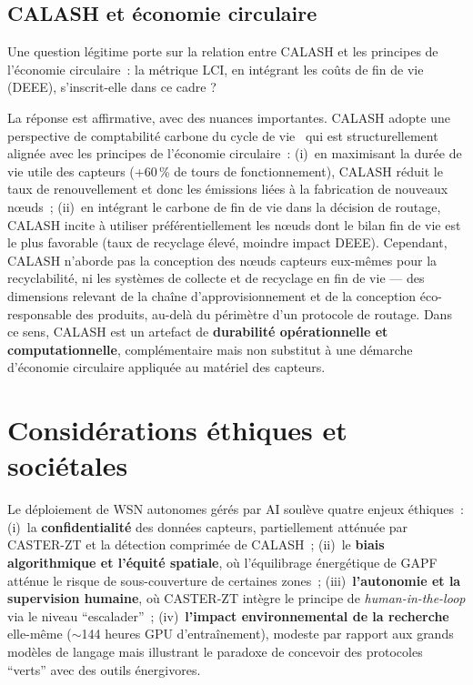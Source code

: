 \subsection{CALASH et économie circulaire}\label{sec:disc-circular}

Une question légitime porte sur la relation entre CALASH et les principes de l'économie circulaire~: la métrique LCI, en intégrant les coûts de fin de vie (DEEE), s'inscrit-elle dans ce cadre ?

La réponse est affirmative, avec des nuances importantes. CALASH adopte une perspective de comptabilité carbone du cycle de vie~\cite{iso14040} qui est structurellement alignée avec les principes de l'économie circulaire~: (i)~en maximisant la durée de vie utile des capteurs (+60\,\% de tours de fonctionnement), CALASH réduit le taux de renouvellement et donc les émissions liées à la fabrication de nouveaux nœuds~; (ii)~en intégrant le carbone de fin de vie dans la décision de routage, CALASH incite à utiliser préférentiellement les nœuds dont le bilan fin de vie est le plus favorable (taux de recyclage élevé, moindre impact DEEE). Cependant, CALASH n'aborde pas la conception des nœuds capteurs eux-mêmes pour la recyclabilité, ni les systèmes de collecte et de recyclage en fin de vie --- des dimensions relevant de la chaîne d'approvisionnement et de la conception éco-responsable des produits, au-delà du périmètre d'un protocole de routage. Dans ce sens, CALASH est un artefact de \textbf{durabilité opérationnelle et computationnelle}, complémentaire mais non substitut à une démarche d'économie circulaire appliquée au matériel des capteurs.


\section{Considérations éthiques et sociétales}\label{sec:disc-ethique}

Le déploiement de WSN autonomes gérés par AI soulève quatre enjeux éthiques~: (i)~la \textbf{confidentialité} des données capteurs, partiellement atténuée par CASTER-ZT et la détection comprimée de CALASH~; (ii)~le \textbf{biais algorithmique et l'équité spatiale}, où l'équilibrage énergétique de GAPF atténue le risque de sous-couverture de certaines zones~; (iii)~\textbf{l'autonomie et la supervision humaine}, où CASTER-ZT intègre le principe de \emph{human-in-the-loop} via le niveau ``escalader''~; (iv)~\textbf{l'impact environnemental de la recherche} elle-même ($\sim$144 heures GPU d'entraînement), modeste par rapport aux grands modèles de langage mais illustrant le paradoxe de concevoir des protocoles ``verts'' avec des outils énergivores.


